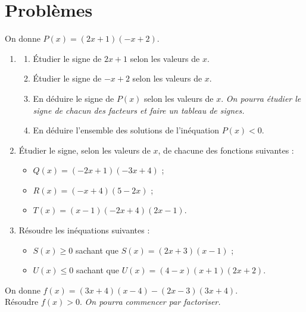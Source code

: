 \sautpage

\section{Probl\`emes}

\begin{multicols}{2}
 


\begin{prob}
On donne $P(x)=(2x+1)(-x+2)$.
\begin{enumerate}
 \item \label{signeq1}
	\begin{enumerate}
	\item \'Etudier le signe de $2x+1$ selon les valeurs de $x$.
	\item \'Etudier le signe de $-x+2$ selon les valeurs de $x$.
	\item En d\'eduire le signe de $P(x)$ selon les valeurs de $x$.
	\emph{On pourra étudier le signe de chacun des facteurs et faire un tableau de signes.}
	\item En d\'eduire l'ensemble des solutions de l'in\'equation $P(x)<0$.
       \end{enumerate} 
  \item \'Etudier le signe, selon les valeurs de $x$, de chacune des fonctions suivantes :
	      \begin{itemize}
		\item $Q(x)=(-2x+1)(-3x+4)$ ;
		\item $R(x)=(-x+4)(5-2x)$ ;
		\item $T(x)=(x-1)(-2x+4)(2x-1)$.
	       \end{itemize}
	  \item R\'esoudre les in\'equations suivantes :
	      \begin{itemize}
		\item $S(x)\geqslant 0$ sachant que $S(x)=(2x+3)(x-1)$ ;
		\item $U(x)\leqslant 0$ sachant que $U(x)=(4-x)(x+1)(2x+2)$.
	      \end{itemize}

\end{enumerate}
\end{prob}


\begin{prob}
On donne $f(x)=(3x+4)(x-4)-(2x-3)(3x+4)$.\\
Résoudre $f(x)>0$. \emph{On pourra commencer par factoriser.}
\end{prob}


\end{multicols}
